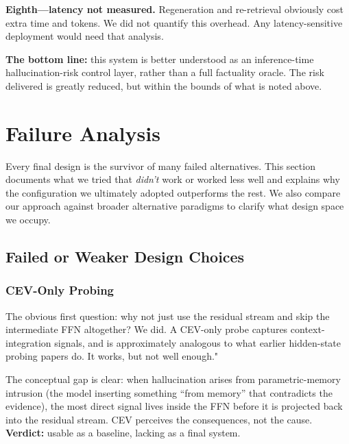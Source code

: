 \textbf{Eighth—latency not measured.} Regeneration and re-retrieval obviously cost extra time and tokens. We did not quantify this overhead. Any latency-sensitive deployment would need that analysis.

\textbf{The bottom line:} this system is better understood as an inference-time hallucination-risk control layer, rather than a full factuality oracle. The risk delivered is greatly reduced, but within the bounds of what is noted above.






\section{Failure Analysis}
\label{sec:failure_analysis}

Every final design is the survivor of many failed alternatives. This section documents what we tried that \emph{didn't} work or worked less well and explains why the configuration we ultimately adopted outperforms the rest. We also compare our approach against broader alternative paradigms to clarify what design space we occupy.

\subsection{Failed or Weaker Design Choices}
\label{subsec:failed_choices}

\subsubsection{CEV-Only Probing}

The obvious first question: why not just use the residual stream and skip the intermediate FFN altogether? We did. A CEV-only probe captures context-integration signals, and is approximately analogous to what earlier hidden-state probing papers do. It works, but not well enough."

The conceptual gap is clear: when hallucination arises from parametric-memory intrusion (the model inserting something ``from memory'' that contradicts the evidence), the most direct signal lives inside the FFN before it is projected back into the residual stream. CEV perceives the consequences, not the cause.\\ \textbf{Verdict:} usable as a baseline, lacking as a final system.

